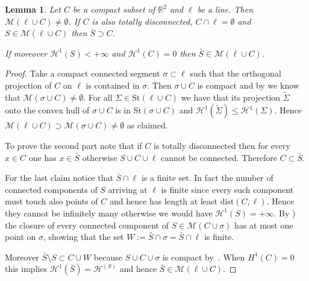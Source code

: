 \documentclass{article}
\newcommand{\RR}{\mathbb R}
\renewcommand{\H}{\mathcal H}
\newcommand{\St}{\mathrm{St}}
\newcommand{\M}{\mathcal{M}}
\renewcommand{\H}{\mathcal{H}}
\newcommand{\dist}{\mathrm{dist}}
\newtheorem{lemma}[theorem]{Lemma}
\theoremstyle{definition}
\theoremstyle{remark}
\begin{document}
\begin{lemma}\label{lm:exists}
  Let $C$ be a compact subset of $\RR^2$ and $\ell$ be a line.
  Then $\M(\ell\cup C)\neq \emptyset$.
  If $C$ is also totally disconnected, $C\cap \ell=\emptyset$ 
  and $S\in \M(\ell\cup C)$  
  then $\bar S \supset C$.

  If moreover $\H^1(S)<+\infty$ and $\H^1(C)=0$ 
  then $\bar S\in \M(\ell\cup C)$.
\end{lemma}
\begin{proof}
  Take a compact connected segment $\sigma\subset \ell$ such that 
  the orthogonal projection of $C$ on $\ell$ is contained 
  in $\sigma$. 
  Then $\sigma\cup C$ is compact and by 
  \cite{PaoSte} we know that 
  $\M(\sigma \cup C)\neq \emptyset$.
  For all $\Sigma \in \St(\ell\cup C)$ we have that its projection 
  $\tilde \Sigma$ 
  onto the convex hull of $\sigma\cup C$ is in $\St(\sigma\cup C)$
  and $\H^1(\tilde \Sigma)\le \H^1(\Sigma)$.
  Hence $\M(\ell\cup C)\supset \M(\sigma\cup C)\neq \emptyset$ as claimed.

  To prove the second part note that if $C$ is totally disconnected 
  then for every $x\in C$ one has $x\in \bar S$ otherwise 
  $S\cup C\cup \ell$ cannot be connected. 
  Therefore $C\subset \bar S$. 
  
  For the last claim notice that $\bar S\cap \ell$ is a finite set.
  In fact the number of connected components of $S$ arriving at $\ell$ 
  is finite since every such component must touch also points of $C$ 
  and hence has length at least $\dist(C,\ell)$.  
  Hence they cannot be infinitely many otherwise 
  we would have $\H^1(S)=+\infty$.
  By \cite{PaoSte}) the closure of every connected component 
  of $S\in\M(C\cup \sigma)$ 
  has at most one point on $\sigma$, showing that the set 
  $W:=\bar S\cap \sigma = \bar S \cap \ell$ 
  is finite.

  Moreover $\bar S \setminus S \subset C\cup W$ because 
  $S\cup C\cup \sigma$ is compact by~\cite{PaoSte}.
  When $H^1(C)=0$ this implies $\H^1(\bar S)=\H^(S)$ and hence 
  $\bar S\in \M(\ell\cup C)$.
\end{proof}
\end{document}
